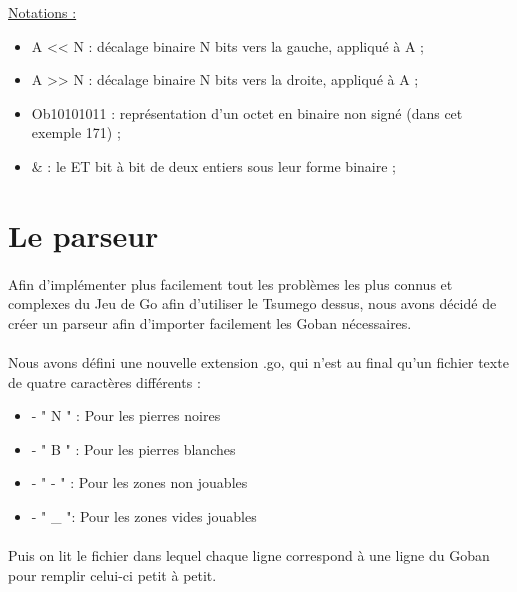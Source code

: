             \begin{framed}
                    \underline{Notations :}
                    \begin{itemize}
                        \item A << N : décalage binaire N bits vers la gauche, appliqué à A ;
                        \item A >> N : décalage binaire N bits vers la droite, appliqué à A ;
                        \item Ob10101011 : représentation d’un octet en binaire non signé (dans cet exemple 171) ;
                        \item \& : le ET bit à bit de deux entiers sous leur forme binaire ;
                    \end{itemize}
                \end{framed}


    \section{Le parseur}
        \paragraph{}Afin d'implémenter plus facilement tout les problèmes les plus connus et complexes du Jeu de Go afin d'utiliser le Tsumego dessus, nous avons décidé de créer un parseur afin d'importer facilement les Goban nécessaires.
        
        \paragraph{}Nous avons défini une nouvelle extension .go, qui n'est au final qu'un fichier texte de quatre caractères différents :
        \begin{itemize}
            \item - " N " : Pour les pierres noires
            \item- " B " : Pour les pierres blanches
            \item- " - " : Pour les zones non jouables
            \item- " \_ ": Pour les zones vides jouables
        \end{itemize}
        
        \paragraph{}Puis on lit le fichier dans lequel chaque ligne correspond à une ligne du Goban pour remplir celui-ci petit à petit.

